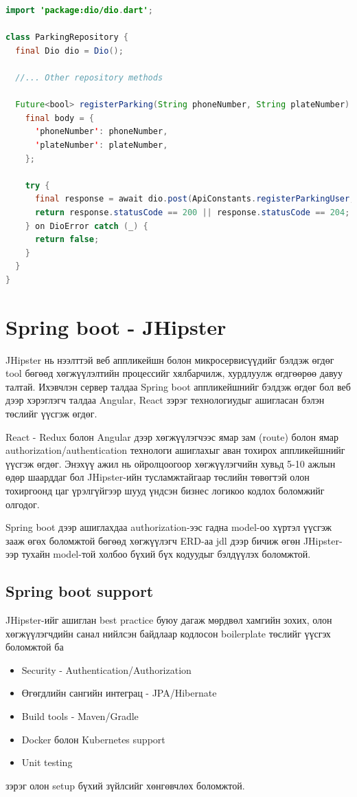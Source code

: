 \newpage

\begin{lstlisting}[language=Java, frame=single, caption=Машины дугаарыг хэрэглэгчийн дугаарын хамтаар сервер дээр бүртгэх]
import 'package:dio/dio.dart';

class ParkingRepository {
  final Dio dio = Dio();

  //... Other repository methods

  Future<bool> registerParking(String phoneNumber, String plateNumber) async {
    final body = {
      'phoneNumber': phoneNumber,
      'plateNumber': plateNumber,
    };

    try {
      final response = await dio.post(ApiConstants.registerParkingUser, data: jsonEncode(body));
      return response.statusCode == 200 || response.statusCode == 204;
    } on DioError catch (_) {
      return false;
    }
  }
}

\end{lstlisting}
\pagebreak

\section{Spring boot - JHipster}
JHipster нь нээлттэй веб аппликейшн болон микросервисүүдийг бэлдэж өгдөг tool бөгөөд хөгжүүлэлтийн процессийг хялбарчилж, хурдлуулж өгдгөөрөө давуу талтай. Ихэвчлэн сервер талдаа Spring boot аппликейшнийг бэлдэж өгдөг бол веб дээр хэрэглэгч талдаа Angular, React зэрэг технологиудыг ашигласан бэлэн төслийг үүсгэж өгдөг.

React - Redux болон Angular дээр хөгжүүлэгчээс ямар зам (route) болон ямар authorization/authentication технологи ашиглахыг аван тохирох аппликейшнийг үүсгэж өгдөг. Энэхүү ажил нь ойролцоогоор хөгжүүлэгчийн хувьд 5-10 ажлын өдөр шаарддаг бол JHipster-ийн тусламжтайгаар төслийн төвөгтэй олон тохиргоонд цаг үрэлгүйгээр шууд үндсэн бизнес логикоо кодлох боломжийг олгодог.

Spring boot дээр ашиглахдаа authorization-ээс гадна model-оо хүртэл үүсгэж зааж өгөх боломжтой бөгөөд хөгжүүлэгч ERD-аа jdl дээр бичиж өгөн JHipster-ээр тухайн model-той холбоо бүхий бүх кодуудыг бэлдүүлэх боломжтой.

\subsection{Spring boot support}
JHipster-ийг ашиглан best practice буюу дагаж мөрдвөл хамгийн зохих, олон хөгжүүлэгчдийн санал нийлсэн байдлаар кодлосон boilerplate төслийг үүсгэх боломжтой ба 
\begin{itemize}
  \item Security - Authentication/Authorization
  \item Өгөгдлийн сангийн интеграц - JPA/Hibernate
  \item Build tools - Maven/Gradle
  \item Docker болон Kubernetes support
  \item Unit testing
\end{itemize}
зэрэг олон setup бүхий зүйлсийг хөнгөвчлөх боломжтой.

